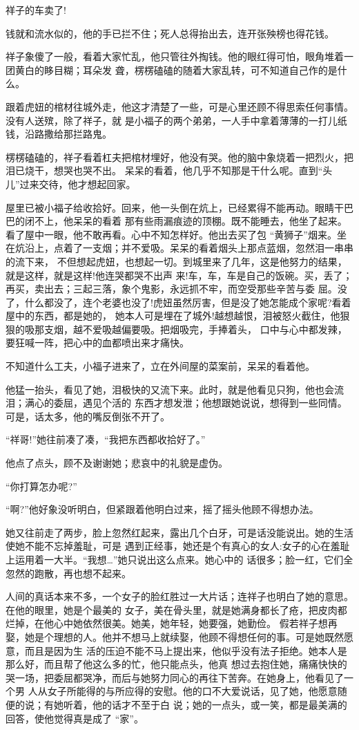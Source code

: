 \documentclass[11pt,a4paper,onecolumn]{article}
\begin{document}
祥子的车卖了!

钱就和流水似的，他的手已拦不住；死人总得抬出去，连开张殃榜也得花钱。

祥子象傻了一般，看着大家忙乱，他只管往外掏钱。他的眼红得可怕，眼角堆着一团黄白的眵目糊；耳朵发
聋，楞楞磕磕的随着大家乱转，可不知道自己作的是什么。

跟着虎妞的棺材往城外走，他这才清楚了一些，可是心里还顾不得思索任何事情。没有人送殡，除了祥子，就
是小福子的两个弟弟，一人手中拿着薄薄的一打儿纸钱，沿路撒给那拦路鬼。

楞楞磕磕的，祥子看着杠夫把棺材埋好，他没有哭。他的脑中象烧着一把烈火，把泪已烧干，想哭也哭不出。
呆呆的看着，他几乎不知那是干什么呢。直到``头儿''过来交待，他才想起回家。

屋里已被小福子给收拾好。回来，他一头倒在炕上，已经累得不能再动。眼睛干巴巴的闭不上，他呆呆的看着
那有些雨漏痕迹的顶棚。既不能睡去，他坐了起来。看了屋中一眼，他不敢再看。心中不知怎样好。他出去买了包
``黄狮子''烟来。坐在炕沿上，点着了一支烟；并不爱吸。呆呆的看着烟头上那点蓝烟，忽然泪一串串的流下来，
不但想起虎妞，也想起一切。到城里来了几年，这是他努力的结果，就是这样，就是这样!他连哭都哭不出声
来!车，车，车是自己的饭碗。买，丢了；再买，卖出去；三起三落，象个鬼影，永远抓不牢，而空受那些辛苦与委
屈。没了，什么都没了，连个老婆也没了!虎妞虽然厉害，但是没了她怎能成个家呢?看着屋中的东西，都是她的，
她本人可是埋在了城外!越想越恨，泪被怒火截住，他狠狠的吸那支烟，越不爱吸越偏要吸。把烟吸完，手捧着头，
口中与心中都发辣，要狂喊一阵，把心中的血都喷出来才痛快。

不知道什么工夫，小福子进来了，立在外间屋的菜案前，呆呆的看着他。

他猛一抬头，看见了她，泪极快的又流下来。此时，就是他看见只狗，他也会流泪；满心的委屈，遇见个活的
东西才想发泄；他想跟她说说，想得到一些同情。可是，话太多，他的嘴反倒张不开了。

``祥哥!''她往前凑了凑，``我把东西都收拾好了。''

他点了点头，顾不及谢谢她；悲哀中的礼貌是虚伪。

``你打算怎办呢?''

``啊?''他好象没听明白，但紧跟着他明白过来，摇了摇头\myrule 他顾不得想办法。

她又往前走了两步，脸上忽然红起来，露出几个白牙，可是话没能说出。她的生活使她不能不忘掉羞耻，可是
遇到正经事，她还是个有真心的女人:女子的心在羞耻上运用着一大半。``我想\ldots ''她只说出这么点来。她心中的
话很多；脸一红，它们全忽然的跑散，再也想不起来。

人间的真话本来不多，一个女子的脸红胜过一大片话；连祥子也明白了她的意思。在他的眼里，她是个最美的
女子，美在骨头里，就是她满身都长了疮，把皮肉都烂掉，在他心中她依然很美。她美，她年轻，她要强，她勤俭。
假若祥子想再娶，她是个理想的人。他并不想马上就续娶，他顾不得想任何的事。可是她既然愿意，而且是因为生
活的压迫不能不马上提出来，他似乎没有法子拒绝。她本人是那么好，而且帮了他这么多的忙，他只能点头，他真
想过去抱住她，痛痛快快的哭一场，把委屈都哭净，而后与她努力同心的再往下苦奔。在她身上，他看见了一个男
人从女子所能得的与所应得的安慰。他的口不大爱说话，见了她，他愿意随便的说；有她听着，他的话才不至于白
说；她的一点头，或一笑，都是最美满的回答，使他觉得真是成了 ``家''。
\end{document}
